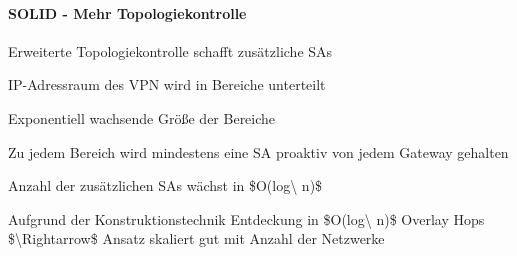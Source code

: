 \documentclass[a4paper]{article}
\begin{document}
\begin{multicols}{3}
\begin{itemize*}
            \paragraph{SOLID - Mehr
                  Topologiekontrolle}
            \begin{itemize*}
                  \item       Erweiterte Topologiekontrolle schafft zusätzliche SAs
                  \item       IP-Adressraum des VPN wird in Bereiche unterteilt
                  \begin{itemize*}
                        \item Exponentiell wachsende Größe der Bereiche
                  \end{itemize*}
                  \item       Zu jedem Bereich wird mindestens eine SA proaktiv von jedem Gateway
                  gehalten
                  \item       Anzahl der zusätzlichen SAs wächst in \$O(log\textbackslash{} n)\$
                  \item       Aufgrund der Konstruktionstechnik Entdeckung in
                  \$O(log\textbackslash{} n)\$ Overlay Hops
                  \$\textbackslash Rightarrow\$ Ansatz skaliert gut mit Anzahl der
                  Netzwerke
            \end{itemize*}


\end{itemize*}
\end{multicols}
\end{document}
